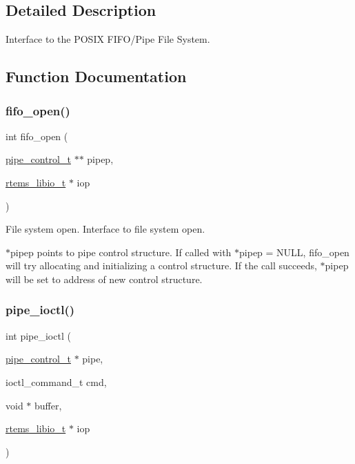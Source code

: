 \subsection{Detailed Description}
Interface to the P\+O\+S\+IX F\+I\+F\+O/\+Pipe File System. 



\subsection{Function Documentation}
\mbox{\label{group__FIFO__PIPE_ga15eb64a7cda614759d385c8f38296ea6}} 
\subsubsection{\texorpdfstring{fifo\_open()}{fifo\_open()}}
{\footnotesize\ttfamily int fifo\+\_\+open (\begin{DoxyParamCaption}\item[{\mbox{\hyperlink{structpipe__control}{pipe\+\_\+control\+\_\+t}} $\ast$$\ast$}]{pipep,  }\item[{\mbox{\hyperlink{structrtems__libio__tt}{rtems\+\_\+libio\+\_\+t}} $\ast$}]{iop }\end{DoxyParamCaption})}



File system open. Interface to file system open. 

$\ast$pipep points to pipe control structure. If called with $\ast$pipep = N\+U\+LL, fifo\+\_\+open will try allocating and initializing a control structure. If the call succeeds, $\ast$pipep will be set to address of new control structure. \mbox{\label{group__FIFO__PIPE_ga9b1bcd47d18b2adaeb414e2936a86f70}} 
\subsubsection{\texorpdfstring{pipe\_ioctl()}{pipe\_ioctl()}}
{\footnotesize\ttfamily int pipe\+\_\+ioctl (\begin{DoxyParamCaption}\item[{\mbox{\hyperlink{structpipe__control}{pipe\+\_\+control\+\_\+t}} $\ast$}]{pipe,  }\item[{ioctl\+\_\+command\+\_\+t}]{cmd,  }\item[{void $\ast$}]{buffer,  }\item[{\mbox{\hyperlink{structrtems__libio__tt}{rtems\+\_\+libio\+\_\+t}} $\ast$}]{iop }\end{DoxyParamCaption})}




